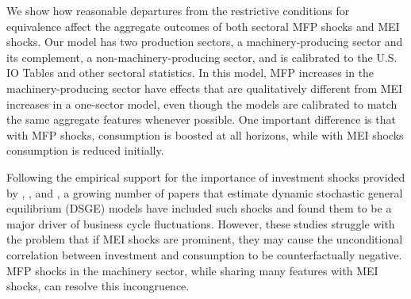 \documentclass[12pt,fleqn]{article}
\begin{document}
We show how reasonable departures from the restrictive conditions for equivalence
affect the aggregate outcomes of both sectoral MFP shocks and MEI shocks. Our
model has two production sectors, a machinery-producing sector and its complement, a non-machinery-producing sector, and is calibrated to the U.S. IO Tables and
other sectoral statistics. In this
model, MFP increases in the machinery-producing sector have effects that are
qualitatively different from MEI increases in a one-sector model, even
though the models are calibrated to match the same aggregate features
whenever possible. One important difference is that with MFP shocks,
consumption is boosted at all horizons, while with MEI shocks consumption is
reduced initially.

Following the empirical support for the importance of investment shocks provided by , , and , a growing number of papers that estimate dynamic stochastic general equilibrium (DSGE) models have included such shocks and found them to be a major driver of business cycle
fluctuations. However, these studies struggle with the problem that if MEI shocks are
prominent, they may cause the unconditional correlation between investment and consumption
to be counterfactually negative. MFP shocks
in the machinery sector, while sharing many features with MEI shocks, can resolve this
incongruence.
\end{document}
